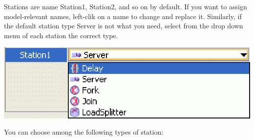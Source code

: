 Stations are name Station1, Station2, and so on by default. If you want to assign model-relevant names, left-clik on a name to change and replace
it.
Similarly, if the default station type Server is not what you need, select from the drop down menu of each station the correct type.\\
\begin{center}
\includegraphics[scale=.5]{img/jsim/station_types.eps}
\end{center}
You can choose among the following types of station:
